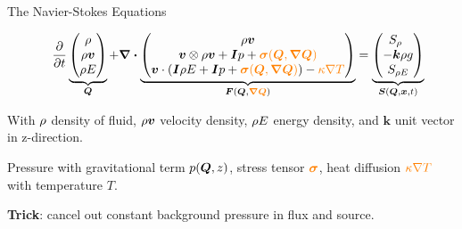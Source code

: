 \documentclass[aspectratio=169]{beamer}
\begin{document}
\begin{frame}{The Navier-Stokes Equations}
\newcommand{\diffCoeff}{\varepsilon}%
\newcommand{\hyperFluxDef}{
  \begin{pmatrix}
    \Qj \\
    \Qv  \otimes \Qj + \bm{I} \pressure  \\
    \Qv \cdot (\bm{I} \QE + \bm{I} \pressure)
  \end{pmatrix}
}%
\newcommand{\viscFluxDef}{
  \begin{pmatrix}
    0\\
     \stressT (\Q, \gradQ)  \\
     \Qv \cdot \stressT (\Q, \gradQ) - \kappa \gradient{T}
   \end{pmatrix}
}%

  \begin{equation}
 \label{eq:equation-set} 
\quad
  \pdv{}{t}
  \underbrace{
  \begin{pmatrix}
    \Qrho\\
    \Qj\\
    \QE
    \end{pmatrix}}_{\Q}
  +
  \divergence{\underbrace{
  \begin{pmatrix}
    \Qj \\
    \Qv  \otimes \Qj + \bm{I} \pressure + \textcolor{orange}{\stressT (\Q, \gradQ)}  \\
    \Qv \cdot \left(\bm{I} \QE + \bm{I} \pressure + \textcolor{orange}{\stressT (\Q, \gradQ)} \right) -
    \textcolor{orange}{\kappa \nabla T}
  \end{pmatrix}}}_{\flux(\Q, \textcolor{orange}{\gradQ})}
 =
  \underbrace{
  \begin{pmatrix}
    \source[\Qrho\phantom{\Qrho}]\\
    - \bm{k} \Qrho g\\
    \source[\QE]
    \end{pmatrix}}_{\source(\Q, \bm{x}, t)}
\end{equation}

With $\rho$ density of fluid, $\rho \bm{v}$ velocity density, $\rho E$ energy density, and $\bm{k}$ unit vector in z-direction.

Pressure with gravitational term $p(\bm{Q}, z)$,
stress tensor $\textcolor{orange}{\bm{\sigma}}$, heat diffusion $\textcolor{orange}{\kappa \nabla T}$ with temperature $T$.

\textbf{Trick}: cancel out constant background pressure in flux and source.

\end{frame}
\end{document}
